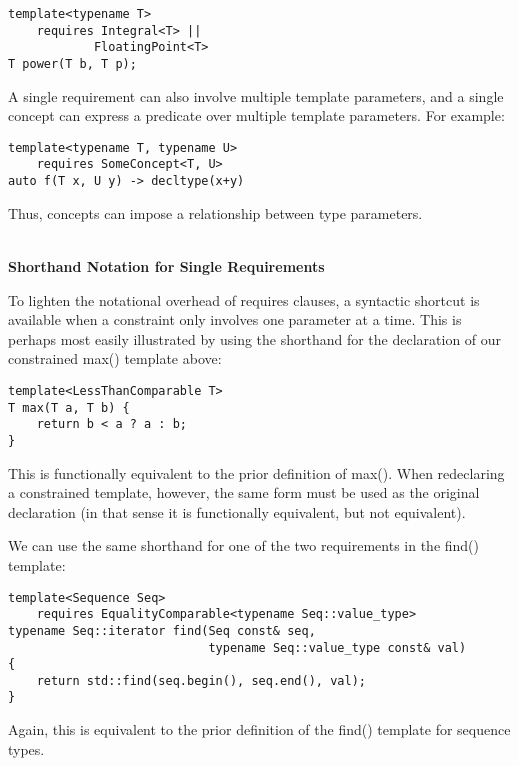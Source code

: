 \begin{lstlisting}[style=styleCXX]
template<typename T>
	requires Integral<T> ||
			FloatingPoint<T>
T power(T b, T p);
\end{lstlisting}

A single requirement can also involve multiple template parameters, and a single concept can express a predicate over multiple template parameters. For example:

\begin{lstlisting}[style=styleCXX]
template<typename T, typename U>
	requires SomeConcept<T, U>
auto f(T x, U y) -> decltype(x+y)
\end{lstlisting}

Thus, concepts can impose a relationship between type parameters.

\hspace*{\fill} \\ %
\noindent
\textbf{Shorthand Notation for Single Requirements}

To lighten the notational overhead of requires clauses, a syntactic shortcut is available when a constraint only involves one parameter at a time. This is perhaps most easily illustrated by using the shorthand for the declaration of our constrained max() template above:

\begin{lstlisting}[style=styleCXX]
template<LessThanComparable T>
T max(T a, T b) {
	return b < a ? a : b;
}
\end{lstlisting}

This is functionally equivalent to the prior definition of max(). When redeclaring a constrained template, however, the same form must be used as the original declaration (in that sense it is functionally equivalent, but not equivalent).

We can use the same shorthand for one of the two requirements in the find() template:

\begin{lstlisting}[style=styleCXX]
template<Sequence Seq>
	requires EqualityComparable<typename Seq::value_type>
typename Seq::iterator find(Seq const& seq,
							typename Seq::value_type const& val)
{
	return std::find(seq.begin(), seq.end(), val);
}
\end{lstlisting}

Again, this is equivalent to the prior definition of the find() template for sequence types.






